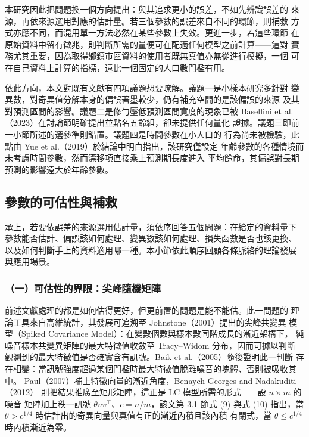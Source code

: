 \documentclass[UTF8, fontset=macnew, a4paper, 12pt]{ctexart}
\begin{document}
本研究因此把問題換一個方向提出：與其追求更小的誤差，不如先辨識誤差的
來源，再依來源選用對應的估計量。若三個參數的誤差來自不同的環節，則補救
方式亦應不同，而混用單一方法必然在某些參數上失效。更進一步，若這些環節
在原始資料中留有徵兆，則判斷所需的量便可在配適任何模型之前計算——這對
實務尤其重要，因為取得鄉鎮市區資料的使用者既無真值亦無從進行模擬，一個
可在自己資料上計算的指標，遠比一個固定的人口數門檻有用。

依此方向，本文對既有文獻有四項議題想要暸解。議題一是小樣本研究多針對
變異數，對奇異值分解本身的偏誤著墨較少，仍有補充空間的是該偏誤的來源
及其對預測區間的影響。議題二是修勻壓低預測區間寬度的現象已被
Basellini et al.（2023）在討論節明確提出並點名五齡組，卻未提供任何量化
證據。議題三即前一小節所述的選參準則錯置。議題四是時間參數在小人口的
行為尚未被檢驗，此點由 Yue et al.（2019）於結論中明白指出，該研究僅設定
年齡參數的各種情境而未考慮時間參數，然而漂移項直接乘上預測期長度進入
平均餘命，其偏誤對長期預測的影響遠大於年齡參數。

\subsection{參數的可估性與補救}

承上，若要依誤差的來源選用估計量，須依序回答五個問題：在給定的資料量下
參數能否估計、偏誤該如何處理、變異數該如何處理、損失函數是否也該更換、
以及如何判斷手上的資料適用哪一種。本小節依此順序回顧各條脈絡的理論發展
與應用場景。

\subsubsection{（一）可估性的界限：尖峰隨機矩陣}\label{sec:bbp}

前述文獻處理的都是如何估得更好，但更前置的問題是能不能估。此一問題的
理論工具來自高維統計，其發展可追溯至 Johnstone（2001）提出的尖峰共變異
模型（Spiked Covariance Model）：在變數個數與樣本數同階成長的漸近架構下，
純噪音樣本共變異矩陣的最大特徵值收斂至 Tracy--Widom 分布，因而可據以判斷
觀測到的最大特徵值是否確實含有訊號。Baik et al.（2005）隨後證明此一判斷
存在相變：當訊號強度超過某個門檻時最大特徵值脫離噪音的塊體、否則被吸收其中。
Paul（2007）補上特徵向量的漸近角度，Benaych-Georges and Nadakuditi（2012）
則把結果推廣至矩形矩陣，這正是 LC 模型所需的形式——設 $n\times m$ 的噪音
矩陣加上秩一訊號 $\theta uv^\top$、$c=n/m$，該文第 3.1 節式 (9) 與式 (10)
指出，當 $\theta>c^{1/4}$ 時估計出的奇異向量與真值有正的漸近內積且該內積
有閉式，當 $\theta\le c^{1/4}$ 時內積漸近為零。
\end{document}
